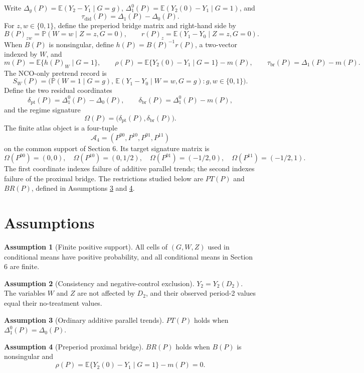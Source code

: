 \documentclass[11pt]{article}
\newcommand{\E}{\mathbb{E}}
\renewcommand{\Pr}{\mathbb{P}}
\theoremstyle{definition}
\newtheorem{assumption}{Assumption}
\theoremstyle{plain}
\theoremstyle{remark}
\begin{document}
Write \(\Delta_g(P)=\E(Y_2-Y_1\mid G=g)\), \(\Delta^0_1(P)=\E(Y_2(0)-Y_1\mid G=1)\), and
\[
  \tau_{\mathrm{did}}(P)=\Delta_1(P)-\Delta_0(P).
\]
For \(z,w\in\{0,1\}\), define the preperiod bridge matrix and right-hand side by
\[
  B(P)_{zw}=\Pr(W=w\mid Z=z,G=0),\qquad
  r(P)_z=\E(Y_1-Y_0\mid Z=z,G=0).
\]
When \(B(P)\) is nonsingular, define \(h(P)=B(P)^{-1}r(P)\), a two-vector indexed by \(W\), and
\[
  m(P)=\E\{h(P)_W\mid G=1\},\qquad
  \rho(P)=\E\{Y_2(0)-Y_1\mid G=1\}-m(P),\qquad
  \tau_{\mathrm{br}}(P)=\Delta_1(P)-m(P).
\]
The NCO-only pretrend record is
\[
  S_W(P)=\Big(\Pr(W=1\mid G=g),\,\E(Y_1-Y_0\mid W=w,G=g):g,w\in\{0,1\}\Big).
\]
Define the two residual coordinates
\[
  \delta_{\mathrm{pt}}(P)=\Delta^0_1(P)-\Delta_0(P),\qquad
  \delta_{\mathrm{br}}(P)=\Delta^0_1(P)-m(P),
\]
and the regime signature
\[
  \Omega(P)=\big(\delta_{\mathrm{pt}}(P),\delta_{\mathrm{br}}(P)\big).
\]
The finite atlas object is a four-tuple
\[
  \mathcal A_4=(P^{00},P^{10},P^{01},P^{11})
\]
on the common support of Section 6. Its target signature matrix is
\[
  \Omega(P^{00})=(0,0),\quad
  \Omega(P^{10})=(0,1/2),\quad
  \Omega(P^{01})=(-1/2,0),\quad
  \Omega(P^{11})=(-1/2,1).
\]
The first coordinate indexes failure of additive parallel trends; the second indexes failure of the proximal bridge. The restrictions studied below are \(PT(P)\) and \(BR(P)\), defined in Assumptions \ref{ass:pt} and \ref{ass:bridge}.

\section{Assumptions}
\begin{assumption}[Finite positive support]\label{ass:support}
All cells of \((G,W,Z)\) used in conditional means have positive probability, and all conditional means in Section 6 are finite.
\end{assumption}

\begin{assumption}[Consistency and negative-control exclusion]\label{ass:exclusion}
\(Y_2=Y_2(D_2)\). The variables \(W\) and \(Z\) are not affected by \(D_2\), and their observed period-2 values equal their no-treatment values.
\end{assumption}

\begin{assumption}[Ordinary additive parallel trends]\label{ass:pt}
\(PT(P)\) holds when \(\Delta^0_1(P)=\Delta_0(P)\).
\end{assumption}

\begin{assumption}[Preperiod proximal bridge]\label{ass:bridge}
\(BR(P)\) holds when \(B(P)\) is nonsingular and
\[
  \rho(P)=\E\{Y_2(0)-Y_1\mid G=1\}-m(P)=0.
\]
\end{assumption}
\end{document}
